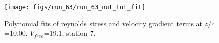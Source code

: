 \begin{figure}[H]
\centering
\texttt{[image: figs/run\_63/run\_63\_nut\_tot\_fit]}
\caption{Polynomial fits of reynolds stress and velocity gradient terms at $z/c$=10.00, $V_{free}$=19.1, station 7.}
\label{fig:run_63_nut_tot_fit}
\end{figure}


